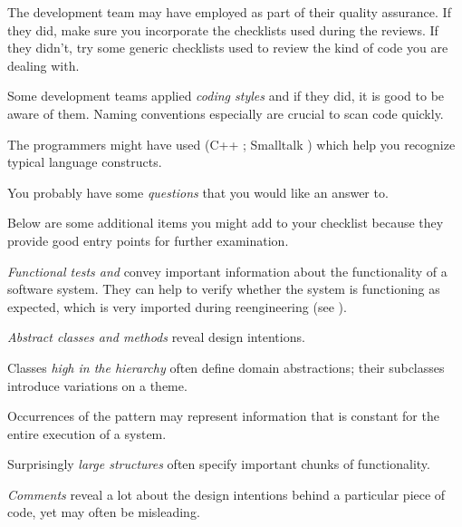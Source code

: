 \documentclass[a4paper,10pt,twoside]{book}
\begin{document}
\begin{bulletlist}
  \item The development team may have employed  as part of their quality assurance. If they did, make sure you incorporate the checklists used during the reviews. If they didn't, try some generic checklists used to review the kind of code you are dealing with.

  \item Some development teams applied \emph{coding styles} and if they did, it is good to be aware of them. Naming conventions especially are crucial to scan code quickly.

  \item The programmers might have used  (\ie C++ \cite{Copl92a} \cite{Meye98a} \cite{Meye96a}; Smalltalk \cite{Beck97a}) which help you recognize typical language constructs.

  \item You probably have some \emph{questions} that you would like an answer to.

\end{bulletlist}

Below are some additional items you might add to your checklist because they provide good entry points for further examination.

\begin{bulletlist}
  \item \emph{Functional tests and } convey important information about the functionality of a software system. They can help to verify whether the system is functioning as expected, which is very imported during reengineering (see ).

  \item \emph{Abstract classes and methods} reveal design intentions.

  \item Classes \emph{high in the hierarchy} often define domain abstractions; their subclasses introduce variations on a theme.

  \item Occurrences of the  pattern may represent information that is constant for the entire execution of a system.

  \item Surprisingly \emph{large structures} often specify important chunks of functionality.

  \item \emph{Comments} reveal a lot about the design intentions behind a particular piece of code, yet may often be misleading.

\end{bulletlist}
\end{document}
